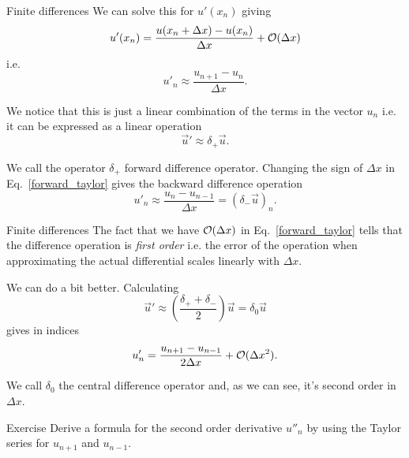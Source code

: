 
\begin{frame}{Finite differences}
	We can solve this for $ u'(x_n) $ giving
	\begin{equation}\label{forward_taylor}
		u'(x_n) =  \frac{u(x_n+\Delta x) - u(x_n)}{\Delta x} + \mathcal{O}(\Delta x)
	\end{equation}
	i.e. 
	\[ u'_n \approx \frac{u_{n+1}-u_n}{\Delta x}. \]
	
	\pause
	We notice that this is just a linear combination of the terms in the vector $ u_n $ i.e. it can be expressed as a linear operation
	\[ \vec{u}' \approx \delta_+ \vec{u}. \]
	
	\pause
	We call the operator $ \delta_+ $ \alert{forward difference} operator. Changing the sign of $ \Delta x $ in Eq.~\eqref{forward_taylor} gives the \alert{backward difference} operation
	\[ u'_n \approx \frac{u_n - u_{n-1}}{\Delta x} = (\delta_- \vec{u})_n. \]
\end{frame}


\begin{frame}{Finite differences}
	The fact that we have $ \mathcal{O}(\Delta x) $ in Eq.~\eqref{forward_taylor} tells that the difference operation is \emph{first order} i.e. the error of the operation when approximating the actual differential scales linearly with $ \Delta x $. 
	
	\pause
	We can do a bit better.  Calculating 
	\[ \vec{u}' \approx \left( \frac{\delta_+ + \delta_-}{2} \right)\vec{u} = \delta_0 \vec{u} \]
	gives in indices 
	\[ u'_n = \frac{u_{n+1}- u_{n-1}}{2 \Delta x} + \mathcal{O}(\Delta x^2). \]
	
	We call $ \delta_0 $ the \alert{central difference} operator and, as we can see, it's second order in $ \Delta x $. 
	
	
\end{frame}



\begin{frame}{Exercise \exercisen}
		Derive a formula for the second order derivative $ u''_n $ by using the Taylor series for $ u_{n+1} $ and $ u_{n-1} $.
\end{frame}

